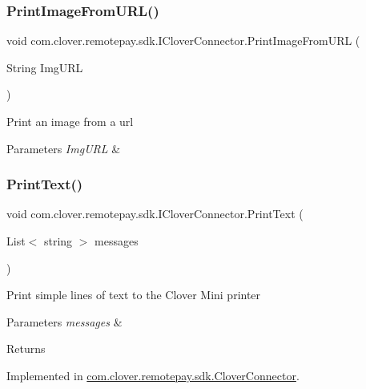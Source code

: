\subsubsection{\texorpdfstring{Print\+Image\+From\+U\+R\+L()}{PrintImageFromURL()}}
{\footnotesize\ttfamily void com.\+clover.\+remotepay.\+sdk.\+I\+Clover\+Connector.\+Print\+Image\+From\+U\+RL (\begin{DoxyParamCaption}\item[{String}]{Img\+U\+RL }\end{DoxyParamCaption})}



Print an image from a url 


\begin{DoxyParams}{Parameters}
{\em Img\+U\+RL} & \\
\hline
\end{DoxyParams}
\mbox{\label{interfacecom_1_1clover_1_1remotepay_1_1sdk_1_1_i_clover_connector_a16a2a91c231e7a66373b2c0e2f612951}} 
\subsubsection{\texorpdfstring{Print\+Text()}{PrintText()}}
{\footnotesize\ttfamily void com.\+clover.\+remotepay.\+sdk.\+I\+Clover\+Connector.\+Print\+Text (\begin{DoxyParamCaption}\item[{List$<$ string $>$}]{messages }\end{DoxyParamCaption})}



Print simple lines of text to the Clover Mini printer 


\begin{DoxyParams}{Parameters}
{\em messages} & \\
\hline
\end{DoxyParams}
\begin{DoxyReturn}{Returns}

\end{DoxyReturn}


Implemented in \hyperlink{classcom_1_1clover_1_1remotepay_1_1sdk_1_1_clover_connector_a1601ef2709d1e2eb53fa92ff1ee46823}{com.\+clover.\+remotepay.\+sdk.\+Clover\+Connector}.

